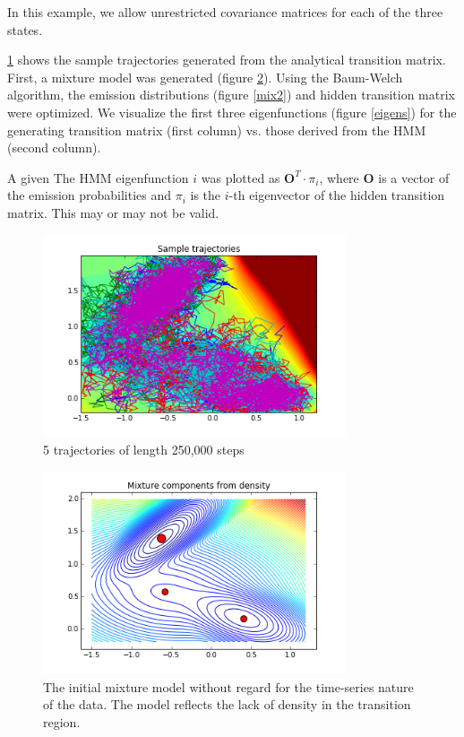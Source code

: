 \documentclass[10pt]{article}
\begin{document}
 In this example, we allow unrestricted covariance matrices
for each of the three states.

\ref{sample-trajectories} shows the sample trajectories generated from the
analytical transition matrix. First, a mixture model was generated (figure \ref{mix1}).
Using the Baum-Welch algorithm, the emission distributions (figure \ref{mix2}) and hidden
transition matrix were optimized. We visualize the first three eigenfunctions (figure \ref{eigens})
for the generating transition matrix (first column) vs. those derived from the HMM (second column).

A given The HMM eigenfunction $i$ was plotted as $\mathbf{O}^T \cdot \pi_i$,
where $\mathbf{O}$ is a vector of the emission probabilities and $\pi_i$ is the
$i$-th eigenvector of the hidden transition matrix. This may or may not be
valid.

\begin{figure}[htbp!]
	\centering
	\includegraphics[width=0.8\textwidth]{sample-trajectories.png}
	\caption{5 trajectories of length 250,000 steps}
	\label{sample-trajectories}
\end{figure}


\begin{figure}[htbp!]
	\centering
	\includegraphics[width=0.8\textwidth]{mix1.png}
	\caption{The initial mixture model without regard
	for the time-series nature of the data. The model
	reflects the lack of density in the transition region.}
	\label{mix1}
\end{figure}
\end{document}
